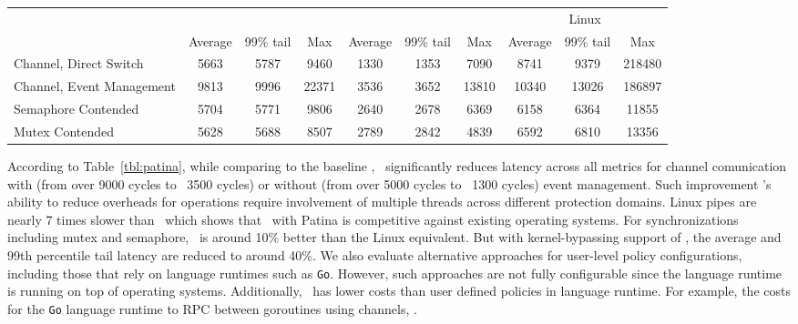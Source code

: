 \begin{table*}[h]
    \centering
	\begin{tabular}{l|c|c|c|c|c|c|c|c|c} \hline
		& \multicolumn{3}{c|}{\cos} & \multicolumn{3}{c|}{\name} & \multicolumn{3}{c}{Linux}\\
			  & Average & 99\% tail & Max & Average & 99\% tail & Max & Average & 99\% tail & Max\\ \hline
		Channel, Direct Switch & 5663 & 5787 & 9460 & 1330 & 1353 & 7090 & 8741 & 9379 & 218480 \\
		Channel, Event Management & 9813 & 9996 & 22371 & 3536 & 3652 & 13810 & 10340 & 13026 & 186897 \\ \hline
		Semaphore Contended & 5704 & 5771 & 9806 & 2640 & 2678 & 6369 & 6158 & 6364 & 11855 \\ \hline
		Mutex Contended & 5628 & 5688 & 8507 & 2789 & 2842 & 4839 & 6592 & 6810 & 13356 \\ \hline
        \end{tabular}
	\caption{\small Patina Overheads in Cycles of \name\ and \cos\ with equivalent Linux operations.}
    \label{tbl:patina}
\end{table*}

According to Table~\ref{tbl:patina}, while comparing to the baseline \cos , \name\ significantly reduces latency across all metrics for channel comunication with (from over 9000 cycles to ~3500 cycles) or without (from over 5000 cycles to ~1300 cycles) event management.
Such improvement \name 's ability to reduce overheads for operations require involvement of multiple threads across different protection domains.
Linux pipes are nearly 7 times slower than \name\ which shows that \name\ with Patina is competitive against existing operating systems.
For synchronizations including mutex and semaphore, \cos\ is around 10\% better than the Linux equivalent.
But with kernel-bypassing support of \name , the average and 99th percentile tail latency are reduced to around 40\%.
We also evaluate alternative approaches for user-level policy configurations, including those that rely on language runtimes such as {\tt Go}.
However, such approaches are not fully configurable since the language runtime is running on top of operating systems.
Additionally, \name\ has lower costs than user defined policies in language runtime.
For example, the costs for the {\tt Go} language runtime to RPC between goroutines using channels, .

